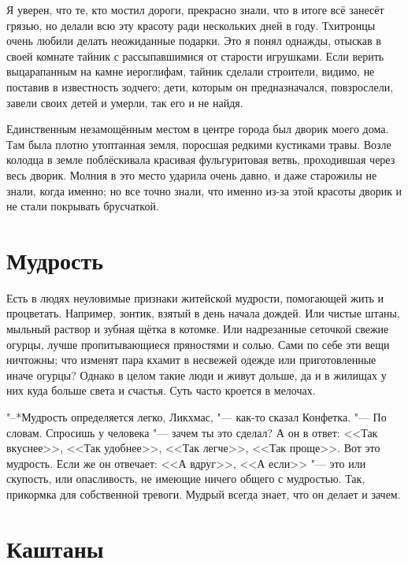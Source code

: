 Я уверен, что те, кто мостил дороги, прекрасно знали, что в итоге всё занесёт грязью, но делали всю эту красоту ради нескольких дней в году.
Тхитронцы очень любили делать неожиданные подарки.
Это я понял однажды, отыскав в своей комнате тайник с рассыпавшимися от старости игрушками.
Если верить выцарапанным на камне иероглифам, тайник сделали строители, видимо, не поставив в известность зодчего;
дети, которым он предназначался, повзрослели, завели своих детей и умерли, так его и не найдя\footnotemark.

Единственным незамощённым местом в центре города был дворик моего дома.
Там была плотно утоптанная земля, поросшая редкими кустиками травы.
Возле колодца в земле поблёскивала красивая фульгуритовая ветвь, проходившая через весь дворик.
Молния в это место ударила очень давно, и даже старожилы не знали, когда именно;
но все точно знали, что именно из-за этой красоты дворик и не стали покрывать брусчаткой.

\section{Мудрость}

Есть в людях неуловимые признаки житейской мудрости, помогающей жить и процветать.
Например, зонтик, взятый в день начала дождей.
Или чистые штаны, мыльный раствор и зубная щётка в котомке.
Или надрезанные сеточкой свежие огурцы, лучше пропитывающиеся пряностями и солью.
Сами по себе эти вещи ничтожны;
что изменят пара кхамит в несвежей одежде или приготовленные иначе огурцы?
Однако в целом такие люди и живут дольше, да и в жилищах у них куда больше света и счастья.
Суть часто кроется в мелочах.

"--*Мудрость определяется легко, Ликхмас, "--- как-то сказал Конфетка.
"--- По словам.
Спросишь у человека "--- зачем ты это сделал?
А он в ответ: <<Так вкуснее>>, <<Так удобнее>>, <<Так легче>>, <<Так проще>>.
Вот это мудрость.
Если же он отвечает: <<А вдруг>>, <<А если>> "--- это или скупость, или опасливость, не имеющие ничего общего с мудростью.
Так, прикормка для собственной тревоги.
Мудрый всегда знает, что он делает и зачем.

\section{Каштаны}

